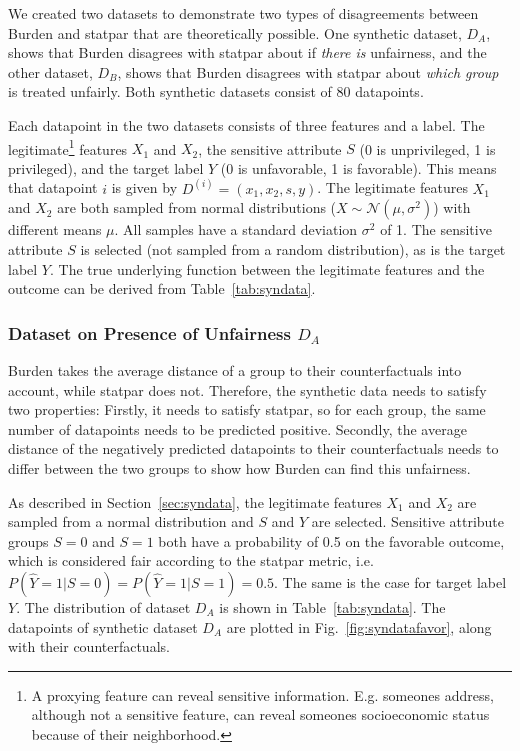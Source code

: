 \documentclass[runningheads]{llncs}
\begin{document}
We created two datasets to demonstrate two types of disagreements between
\gls{Burden} and \gls{statpar} that are theoretically possible. One synthetic
dataset, $D_A$, shows that \gls{Burden} disagrees with \gls{statpar} about if
\textit{there is} unfairness, and the other dataset, $D_B$, shows that
\gls{Burden} disagrees with \gls{statpar} about \emph{which group} is treated
unfairly. Both synthetic datasets consist of 80 datapoints.

Each datapoint in the two datasets consists of three features and a label. The
\gls{legitimate}\footnote{A proxying feature can reveal sensitive information.
E.g. someones address, although not a sensitive feature, can reveal someones
socioeconomic status because of their neighborhood.} features $X_1$ and $X_2$,
the sensitive attribute $S$ (0 is unprivileged, 1 is privileged), and the
target label $Y$ (0 is unfavorable, 1 is favorable). This means that datapoint
$i$ is given by $ D^{(i)} = (x_1, x_2, s, y)$. The \gls{legitimate} features
$X_1$ and $X_2$ are both sampled from normal distributions ($X \sim
\mathcal{N}(\mu, \sigma^2)$) with different means $\mu$. All samples have a
standard deviation $\sigma^2$ of 1. The sensitive attribute $S$ is selected
(not sampled from a random distribution), as is the target label $Y$. The true
underlying function between the legitimate features and the outcome can be
derived from Table~\ref{tab:syndata}.

\subsubsection{Dataset on Presence of Unfairness $D_A$}

\gls{Burden} takes the average distance of a group to their counterfactuals
into account, while \gls{statpar} does not. Therefore, the synthetic data needs
to satisfy two properties: Firstly, it needs to satisfy \gls{statpar}, so for
each group, the same number of datapoints needs to be predicted positive.
Secondly, the average distance of the negatively predicted datapoints to their
counterfactuals needs to differ between the two groups to show how \gls{Burden}
can find this unfairness.

As described in Section~\ref{sec:syndata}, the \gls{legitimate} features $X_1$
and $X_2$ are sampled from a normal distribution and $S$ and $Y$ are selected.
Sensitive attribute groups $S=0$ and $S=1$ both have a probability of 0.5 on
the favorable outcome, which is considered fair according to the \gls{statpar}
metric, i.e. $P(\hat{Y}=1|S=0) = P(\hat{Y}=1|S=1) = 0.5$. The same is the case
for target label $Y$. The distribution of dataset $D_A$ is shown in
Table~\ref{tab:syndata}. The datapoints of synthetic dataset $D_A$ are plotted
in Fig.~\ref{fig:syndatafavor}, along with their counterfactuals.
\end{document}
